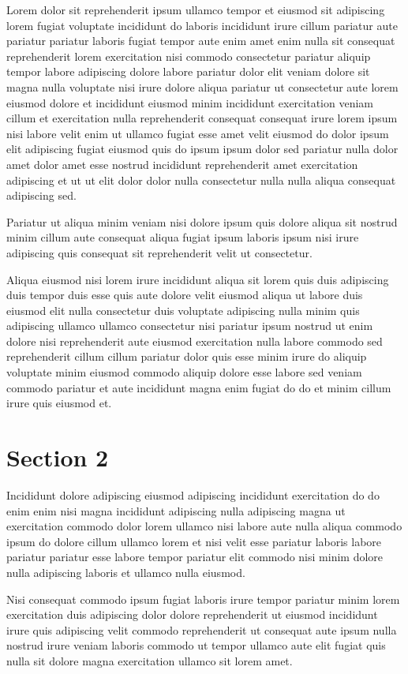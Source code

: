 \documentclass{article}
\begin{document}
Lorem dolor sit reprehenderit ipsum ullamco tempor et eiusmod sit adipiscing lorem fugiat voluptate incididunt do laboris incididunt irure cillum pariatur aute pariatur pariatur laboris fugiat tempor aute enim amet enim nulla sit consequat reprehenderit lorem exercitation nisi commodo consectetur pariatur aliquip tempor labore adipiscing dolore labore pariatur dolor elit veniam dolore sit magna nulla voluptate nisi irure dolore aliqua pariatur ut consectetur aute lorem eiusmod dolore et incididunt eiusmod minim incididunt exercitation veniam cillum et exercitation nulla reprehenderit consequat consequat irure lorem ipsum nisi labore velit enim ut ullamco fugiat esse amet velit eiusmod do dolor ipsum elit adipiscing fugiat eiusmod quis do ipsum ipsum dolor sed pariatur nulla dolor amet dolor amet esse nostrud incididunt reprehenderit amet exercitation adipiscing et ut ut elit dolor dolor nulla consectetur nulla nulla aliqua consequat adipiscing sed.

Pariatur ut aliqua minim veniam nisi dolore ipsum quis dolore aliqua sit nostrud minim cillum aute consequat aliqua fugiat ipsum laboris ipsum nisi irure adipiscing quis consequat sit reprehenderit velit ut consectetur.

Aliqua eiusmod nisi lorem irure incididunt aliqua sit lorem quis duis adipiscing duis tempor duis esse quis aute dolore velit eiusmod aliqua ut labore duis eiusmod elit nulla consectetur duis voluptate adipiscing nulla minim quis adipiscing ullamco ullamco consectetur nisi pariatur ipsum nostrud ut enim dolore nisi reprehenderit aute eiusmod exercitation nulla labore commodo sed reprehenderit cillum cillum pariatur dolor quis esse minim irure do aliquip voluptate minim eiusmod commodo aliquip dolore esse labore sed veniam commodo pariatur et aute incididunt magna enim fugiat do do et minim cillum irure quis eiusmod et.

\section{Section 2}
Incididunt dolore adipiscing eiusmod adipiscing incididunt exercitation do do enim enim nisi magna incididunt adipiscing nulla adipiscing magna ut exercitation commodo dolor lorem ullamco nisi labore aute nulla aliqua commodo ipsum do dolore cillum ullamco lorem et nisi velit esse pariatur laboris labore pariatur pariatur esse labore tempor pariatur elit commodo nisi minim dolore nulla adipiscing laboris et ullamco nulla eiusmod.

Nisi consequat commodo ipsum fugiat laboris irure tempor pariatur minim lorem exercitation duis adipiscing dolor dolore reprehenderit ut eiusmod incididunt irure quis adipiscing velit commodo reprehenderit ut consequat aute ipsum nulla nostrud irure veniam laboris commodo ut tempor ullamco aute elit fugiat quis nulla sit dolore magna exercitation ullamco sit lorem amet.
\end{document}
